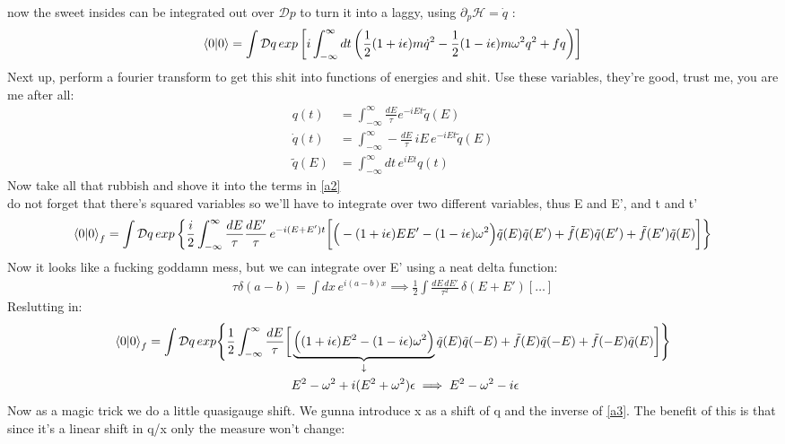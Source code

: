 \documentclass{article}
\begin{document}
now the sweet insides can be integrated out over $\mathcal{D}p$ to turn it into a laggy, using $\partial_{p}\mathcal{H} = \dot{q}$ :
\begin{align}
	\braket{0}{0}=\int \mathcal{D}q \,exp \left[ i \int_{-\infty}^{\infty}dt \left( \frac{1}{2}(1+i\epsilon)m\dot{q}^2 - \frac{1}{2}(1-i\epsilon)m\omega^2q^2 + fq \right) \right] \label{a2}
\end{align}
Next up, perform a fourier transform to get this shit into functions of energies and shit. Use these variables, they're good, trust me, you are me after all:
\begin{align}
	q(t)&=\int_{-\infty}^{\infty} \frac{dE}{\tau} e^{-iEt} \tilde{q}(E) \\
	\dot{q}(t)&=\int_{-\infty}^{\infty} -\frac{dE}{\tau}\,iE\,e^{-iEt} \tilde{q}(E) \\
\tilde{q}(E)&=\int_{-\infty}^{\infty}dt\,e^{iEt}q(t)
\end{align}
Now take all that rubbish and shove it into the terms in \ref{a2} \\ do not forget that there's squared variables so we'll have to integrate over two different variables, thus E and E', and t and t'
\begin{align}
	\braket{0}{0}_f = \int \mathcal{D}q\, exp \left\{ \frac{i}{2} \int_{-\infty}^{\infty} \frac{dE}{\tau} \frac{dE'}{\tau}\, e^{-i(E+E')t} \bigg[ \Big( -(1+i\epsilon)EE' - (1-i\epsilon)\omega^2 \Big) \tilde{q}(E) \tilde{q}(E') + \tilde{f}(E) \tilde{q}(E') + \tilde{f}(E') \tilde{q}(E) \bigg] \right\}
\end{align}
Now it looks like a fucking goddamn mess, but we can integrate over E' using a neat delta function:
\begin{align}
	\tau \delta(a-b)= \int dx\,e^{i(a-b)x} \implies \frac{1}{2} \int \frac{dE\,dE'}{\tau^2} \,\delta(E+E') [ \ldots ]
\end{align}
\newpage Reslutting in:
\begin{align}
	\braket{0}{0}_f = \int \mathcal{D}q\, exp \Bigg\{ \frac{1}{2} \int_{-\infty}^{\infty} \frac{dE}{\tau} \bigg[ &\underbrace{ \Big( (1+i\epsilon)E^2 - (1-i\epsilon)\omega^2 \Big) }_{\downarrow} \tilde{q}(E) \tilde{q}(-E) + \tilde{f}(E) \tilde{q}(-E) + \tilde{f}(-E) \tilde{q}(E) \bigg]  \Bigg\} \label{a4} \\
														     &E^2 - \omega^2 + i(E^2 + \omega^2)\epsilon \implies E^2 - \omega^2 - i\epsilon \label{a3}
\end{align}
Now as a magic trick we do a little quasigauge shift. We gunna introduce x as a shift of q and the inverse of \ref{a3}. The benefit of this is that since it's a linear shift in q/x only the measure won't change:
\end{document}
